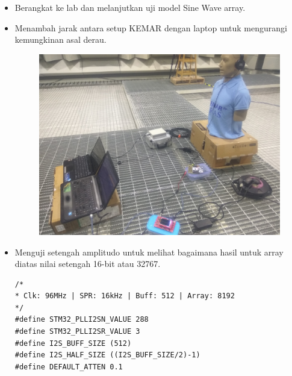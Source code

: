 \documentclass[12pt,]{article}
\begin{document}
	\begin{itemize}
		\item Berangkat ke lab dan melanjutkan uji model Sine Wave array.
		\item Menambah jarak antara setup KEMAR dengan laptop untuk mengurangi kemungkinan asal derau.
		\begin{figure}[H]
			\centering
			\includegraphics[width=0.5\linewidth]{day_4/distance}
		\end{figure}
		\item Menguji setengah amplitudo untuk melihat bagaimana hasil untuk array
		diatas nilai setengah 16-bit atau 32767.  
		\begin{verbatim}
/*
* Clk: 96MHz | SPR: 16kHz | Buff: 512 | Array: 8192
*/
#define STM32_PLLI2SN_VALUE 288
#define STM32_PLLI2SR_VALUE 3
#define I2S_BUFF_SIZE (512)
#define I2S_HALF_SIZE ((I2S_BUFF_SIZE/2)-1)
#define DEFAULT_ATTEN 0.1


\end{verbatim}
\end{itemize}
\end{document}
